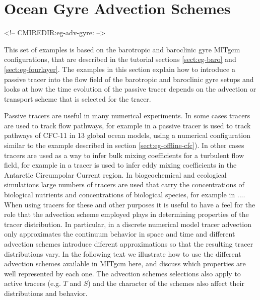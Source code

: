 


\section[Gyre Advection Example]{Ocean Gyre Advection Schemes}
\label{www:tutorials}
\label{sect:eg-adv-gyre}
\begin{rawhtml}
<!-- CMIREDIR:eg-adv-gyre: -->
\end{rawhtml}

This set of examples is based on the barotropic and baroclinic gyre MITgcm configurations,
that are described in the tutorial sections \ref{sect:eg-baro} and \ref{sect:eg-fourlayer}. 
The examples in this section explain how to introduce a passive tracer into the flow 
field of the barotropic and baroclinic gyre setups and looks at how the time evolution
of the passive tracer depends on the advection or transport scheme that is selected 
for the tracer. 

Passive tracers are useful in many numerical experiments. In some cases tracers are
used to track flow pathways, for example in \cite{Dutay02} a passive tracer is used
to track pathways of CFC-11 in 13 global ocean models, using a numerical
configuration similar to the example described in section \ref{sect:eg-offline-cfc}).
In other cases tracers are used as a way
to infer bulk mixing coefficients for a turbulent flow field, for example in 
\cite{marsh06} a tracer is used to infer eddy mixing coefficients in the
Antarctic Circumpolar Current region. In biogeochemical and ecological simulations large numbers 
of tracers are used that carry the concentrations of biological nutrients and concentrations of 
biological species, for example in ....
When using tracers for these and other purposes it is useful to have a feel for the role
that the advection scheme employed plays in determining properties of the tracer distribution.
In particular, in a discrete numerical model tracer advection only approximates the 
continuum behavior in space and time and different advection schemes introduce diferent 
approximations so that the resulting tracer distributions vary. In the following 
text we illustrate how
to use the different advection schemes available in MITgcm here, and discuss which properties 
are well represented by each one. The advection schemes selections also apply to active
tracers (e.g. $T$ and $S$) and the character of the schemes also affect their distributions
and behavior.


